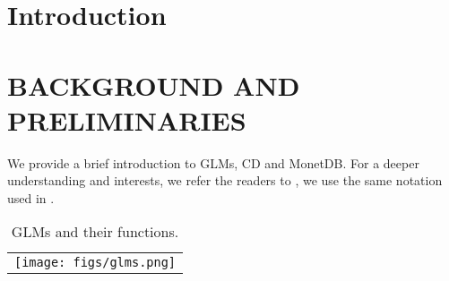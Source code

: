 \documentclass{vldb}
\begin{document}


\maketitle

\begin{abstract}

\end{abstract}

\newpage %


\section{Introduction}

\newpage %

\section{BACKGROUND AND PRELIMINARIES}
We provide a brief introduction to GLMs, CD and MonetDB. For a deeper understanding and interests, we refer the 
readers to \cite{hastie}\cite{Mitchell}\cite{Wright1}\cite{Boncz}, we use the same notation used in \cite{Kumar}.

\begin{table}
\begin{tabular}{c}
\texttt{[image: figs/glms.png]}
\end{tabular}
\vspace{-4mm}
\caption{GLMs and their functions.}
\label{tab:glms}
\end{table}
\end{document}
